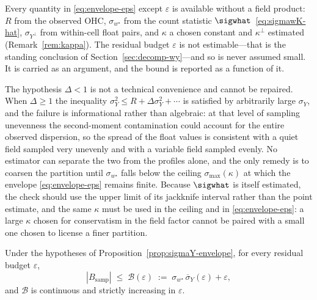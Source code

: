 Every quantity in \eqref{eq:envelope-eps} except $\varepsilon$ is
available without a field product: $R$ from the observed OHC,
$\sigma_{w^{\star}}$ from the count statistic
$\sigwhat$~\eqref{eq:sigmawK-hat}, $\sigma_{Y^{\perp}}$ from within-cell
float pairs, and
$\kappa$ a chosen constant and $\kappa^{\perp}$ estimated
(Remark~\ref{rem:kappa}). The residual budget $\varepsilon$ is not
estimable---that is the standing conclusion of
Section~\ref{sec:decomp-wy}---and so is never assumed small. It is
carried as an argument, and the bound is reported as a function of it.

\begin{remark}
\label{rem:delta-fails}
The hypothesis $\Delta<1$ is not a technical convenience and cannot be
repaired. When $\Delta\ge1$ the inequality
$\sigma_Y^2\le R+\Delta\sigma_Y^2+\cdots$ is satisfied by arbitrarily
large $\sigma_Y$, and the failure is informational rather than
algebraic: at that level of sampling unevenness the second-moment
contamination could account for the entire observed dispersion, so the
spread of the float values is consistent with a quiet field sampled very
unevenly and with a variable field sampled evenly. No estimator can
separate the two from the profiles alone, and the only remedy is to
coarsen the partition until $\sigma_{w^{\star}}$ falls below the ceiling
$\sigma_{\max}(\kappa)$ at which the envelope \eqref{eq:envelope-eps}
remains finite. Because $\sigwhat$ is itself
estimated, the check should use the upper limit of its jackknife interval
rather than the point estimate, and the same $\kappa$ must be used in the
ceiling and in \eqref{eq:envelope-eps}: a large $\kappa$ chosen for
conservatism in the field factor cannot be paired with a small one chosen
to license a finer partition.
\end{remark}

\begin{corollary}
\label{cor:field-free}
Under the hypotheses of Proposition~\ref{prop:sigmaY-envelope}, for every
residual budget $\varepsilon$,
\begin{equation}
  |B_{\mathrm{samp}}|
  \;\le\;\mathcal{B}(\varepsilon)
  \;:=\;\sigma_{w^{\star}}\,\overline{\sigma}_Y(\varepsilon)
        +\varepsilon ,
  \label{eq:bias-eps}
\end{equation}
and $\mathcal{B}$ is continuous and strictly increasing in $\varepsilon$.
\end{corollary}

